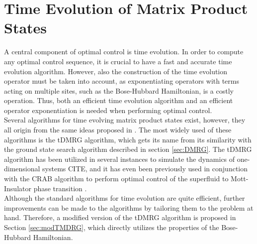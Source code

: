 \section{Time Evolution of Matrix Product States}
A central component of optimal control is time evolution. In order to compute any optimal control sequence, it is crucial to have a fast and accurate time evolution algorithm. However, also the construction of the time evolution operator must be taken into account, as exponentiating operators with terms acting on multiple sites, such as the Bose-Hubbard Hamiltonian, is a costly operation. Thus, both an efficient time evolution algorithm and an efficient operator exponentiation is needed when performing optimal control.\\
Several algorithms for time evolving matrix product states exist, however, they all origin from the same ideas proposed in \cite{Vidal2003,Vidal2004}. The most widely used of these algorithms is the tDMRG algorithm, which gets its name from its similarity with the ground state search algorithm described in section \ref{sec:DMRG}. The tDMRG algorithm has been utilized in several instances to simulate the dynamics of one-dimensional systems CITE, and it has even been previously used in conjunction with the CRAB algorithm to perform optimal control of the superfluid to Mott-Insulator phase transition \cite{FrankBloch,Doria2011}.\\
Although the standard algorithms for time evolution are quite efficient, further improvements can be made to the algorithms by tailoring them to the problem at hand. Therefore, a modified version of the tDMRG algorithm is proposed in Section \ref{sec:modTMDRG}, which directly utilizes the properties of the Bose-Hubbard Hamiltonian.


